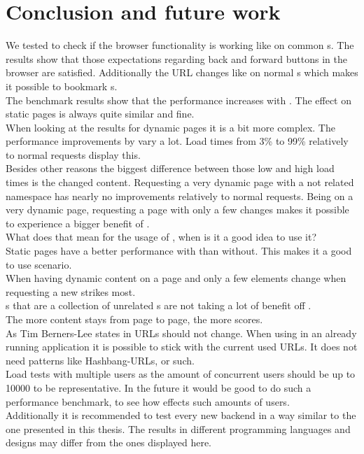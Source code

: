 \section{Conclusion and future work}

We tested \lare{} to check if the browser functionality is working like on common \webApplication{}s.
The results show that those expectations regarding back and forward buttons in the browser are satisfied.
Additionally the URL changes like on normal \webApplication{}s which makes it possible to bookmark \webPage{}s.
\\
The benchmark results show that the performance increases with \lare{}.
The effect on static pages is always quite similar and fine.
\\
When looking at the results for dynamic pages it is a bit more complex.
The performance improvements by \lare{} vary a lot.
Load times from 3\% to 99\% relatively to normal requests display this.
\\
Besides other reasons the biggest difference between those low and high load times is the changed content.
Requesting a very dynamic page with a not related namespace has nearly no improvements relatively to normal requests.
Being on a very dynamic page, requesting a page with only a few changes makes it possible to experience a bigger benefit of \lare{}.
\\
What does that mean for the usage of \lare{}, when is it a good idea to use it?
\\
Static pages have a better performance with \lare{} than without.
This makes it a good to use scenario.
\\
When having dynamic content on a page and only a few elements change when requesting a new \webPage{} \lare{} strikes most.
\\
\webSite{}s that are a collection of unrelated \webPage{}s are not taking a lot of benefit off \lare{}.
\\
The more content stays from page to page, the more \lare{} scores.
\\
As Tim Berners-Lee states in \cite{berners1998cool} URLs should not change.
When using \lare{} in an already running application it is possible to stick with the current used URLs.
It does not need patterns like Hashbang-URLs, or such.
\\
Load tests with multiple users as the amount of concurrent users should be up to 10000 to be representative\cite{bozdag2008performance}.
In the future it would be good to do such a performance benchmark, to see how \lare{} effects such amounts of users.
\\
Additionally it is recommended to test every new \lare{} backend in a way similar to the one presented in this thesis.
The results in different programming languages and \webApplication{} designs may differ from the ones displayed here.
